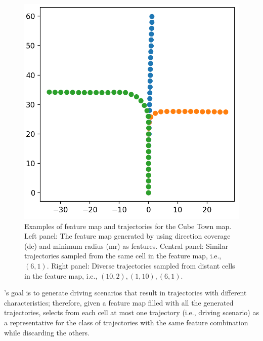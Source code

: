\documentclass[conference]{IEEEtran}
\begin{document}
\begin{figure}[t]
\endminipage\hfill
{}%
  \includegraphics[width=\linewidth]{images/roads_different_cell.png}
\endminipage
\caption{Examples of feature map and trajectories for the Cube Town map. 
Left panel: The feature map generated by \tool using direction coverage (dc) and minimum radius (mr) as features.
Central panel: Similar trajectories sampled from the same cell in the feature map, i.e., $(6,1)$.  
Right panel: Diverse trajectories sampled from distant cells in the feature map, i.e., $(10,2), (1,10), (6,1)$.}
\label{fig:feature-maps}
\end{figure}

\tool's goal is to generate driving scenarios that result in trajectories with different characteristics; therefore, given a feature map filled with all the generated trajectories, \tool selects from each cell at most one trajectory (i.e., driving scenario) as a representative for the class of trajectories with the same feature combination while discarding the others.
\end{document}
